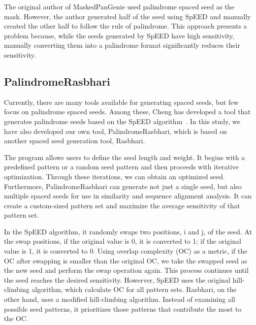 \documentclass[PhD]{PHlab-thesis}
\begin{document}
The original author of MaskedPanGenie used palindrome spaced seed as the mask. However, the author generated half of the seed using SpEED and manually created the other half to follow the rule of palindrome. This approach presents a problem because, while the seeds generated by SpEED have high sensitivity, manually converting them into a palindrome format significantly reduces their sensitivity.

\subsection{PalindromeRasbhari}
Currently, there are many tools available for generating spaced seeds, but few focus on palindrome spaced seeds. Among these, Cheng has developed a tool that generates palindrome seeds based on the SpEED algorithm~\cite{garyMaskedPanGenie}. In this study, we have also developed our own tool, PalindromeRasbhari, which is based on another spaced seed generation tool, Rasbhari.

The program allows users to define the seed length and weight. It begins with a predefined pattern or a random seed pattern and then proceeds with iterative optimization. Through these iterations, we can obtain an optimized seed. Furthermore, PalindromeRasbhari can generate not just a single seed, but also multiple spaced seeds for use in similarity and sequence alignment analysis. It can create a custom-sized pattern set and maximize the average sensitivity of that pattern set.

In the SpEED algorithm, it randomly swaps two positions, i and j, of the seed. At the swap positions, if the original value is 0, it is converted to 1; if the original value is 1, it is converted to 0. Using overlap complexity (OC) as a metric, if the OC after swapping is smaller than the original OC, we take the swapped seed as the new seed and perform the swap operation again. This process continues until the seed reaches the desired sensitivity.
Howerver, SpEED uses the original hill-climbing algorithm, which calculate OC for all pattern sets. Rasbhari, on the other hand, uses a modified hill-climbing algorithm. Instead of examining all possible seed patterns, it prioritizes those patterns that contribute the most to the OC.
\end{document}
